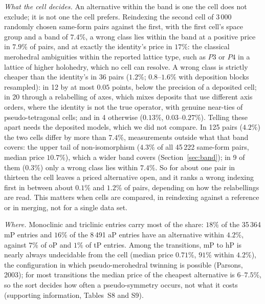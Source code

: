 \emph{What the cell decides.} An alternative within the band is one the cell does not exclude; it is not one the cell prefers. Reindexing the second cell of 3\,000 randomly chosen same-form pairs against the first, with the first cell's space group and a band of $7.4\%$, a wrong class lies within the band at a positive price in $7.9\%$ of pairs, and at exactly the identity's price in $17\%$: the classical merohedral ambiguities within the reported lattice type, such as $P3$ or $P4$ in a lattice of higher holohedry, which no cell can resolve. A wrong class is strictly cheaper than the identity's in 36 pairs ($1.2\%$; $0.8$--$1.6\%$ with deposition blocks resampled): in 12 by at most $0.05$ points, below the precision of a deposited cell; in 20 through a relabelling of axes, which mixes deposits that use different axis orders, where the identity is not the true operator, with genuine near-ties of pseudo-tetragonal cells; and in 4 otherwise ($0.13\%$, $0.03$--$0.27\%$). Telling these apart needs the deposited models, which we did not compare. In 125 pairs ($4.2\%$) the two cells differ by more than $7.4\%$, measurements outside what that band covers: the upper tail of non-isomorphism ($4.3\%$ of all 45\,222 same-form pairs, median price $10.7\%$), which a wider band covers (Section~\ref{sec:band}); in 9 of them ($0.3\%$) only a wrong class lies within $7.4\%$. So for about one pair in thirteen the cell leaves a priced alternative open, and it ranks a wrong indexing first in between about $0.1\%$ and $1.2\%$ of pairs, depending on how the relabellings are read. This matters when cells are compared, in reindexing against a reference or in merging, not for a single data set.

\emph{Where.} Monoclinic and triclinic entries carry most of the share: $18\%$ of the 35\,364 mP entries and $16\%$ of the 8\,491 aP entries have an alternative within $4.2\%$, against $7\%$ of oP and $1\%$ of tP entries. Among the transitions, mP to hP is nearly always undecidable from the cell (median price $0.71\%$, $91\%$ within $4.2\%$), the configuration in which pseudo-merohedral twinning is possible (Parsons, 2003); for most transitions the median price of the cheapest alternative is $6$--$7.5\%$, so the sort decides how often a pseudo-symmetry occurs, not what it costs (supporting information, Tables~S8 and S9).

